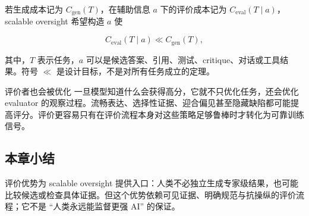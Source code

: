 若生成成本记为 $C_{\mathrm{gen}}(T)$，在辅助信息 $a$ 下的评价成本记为 $C_{\mathrm{eval}}(T\mid a)$，scalable oversight 希望构造 $a$ 使

\[
C_{\mathrm{eval}}(T\mid a) \ll C_{\mathrm{gen}}(T),
\]

其中，$T$ 表示任务，$a$ 可以是候选答案、引用、测试、critique、对话或工具结果。符号 $\ll$ 是设计目标，不是对所有任务成立的定理。

\begin{warningbox}{评价者也会被优化}
一旦模型知道什么会获得高分，它就不只优化任务，还会优化 evaluator 的观察过程。流畅表达、选择性证据、迎合偏见甚至隐藏缺陷都可能提高评分。评价更容易只有在评价流程本身对这些策略足够鲁棒时才转化为可靠训练信号。
\end{warningbox}

\subsection{本章小结}

评价优势为 scalable oversight 提供入口：人类不必独立生成专家级结果，也可能比较候选或检查具体证据。但这个优势依赖可见证据、明确规范与抗操纵的评价流程；它不是 ``人类永远能监督更强 AI'' 的保证。

